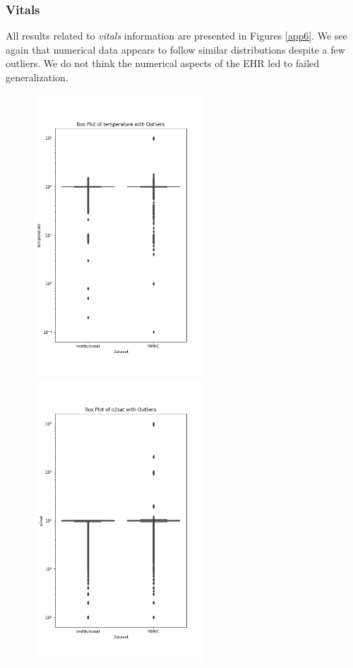 \documentclass[pmlr]{jmlr}%
\begin{document}
 \subsubsection*{Vitals}
All results related to \textit{vitals} information are presented in Figures \ref{app6}. We see again that numerical data appears to follow similar distributions despite a few outliers. We do not think the numerical aspects of the EHR led to failed generalization.
\begin{figure}[h!]
   \centering 
   \includegraphics[width=2.5in]{plots/temperature_boxplot.png} 
   \includegraphics[width=2.5in]{plots/o2sat_boxplot.png} 

\end{figure}
\end{document}
